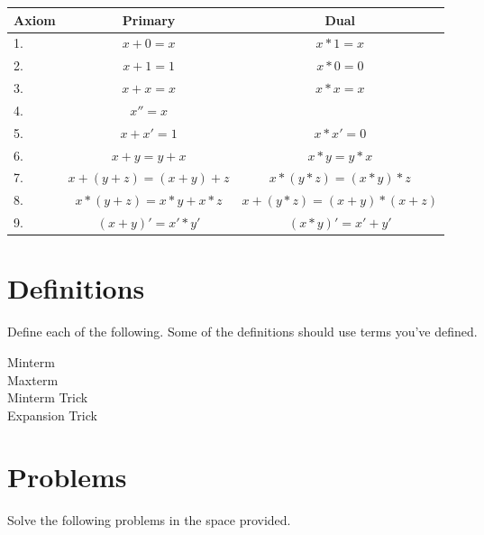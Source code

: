 \vspace{0.2in}
\begin{tabular}[ht]{lc>{\quad}c} %
    Axiom   &     Primary              &     Dual                    \\[0.1em] \hline
    1.      & $   x+0=x              $ & $   x*1=x                 $ \\[0.1em] \hline
    2.      & $   x+1=1              $ & $   x*0=0                 $ \\[0.1em] \hline
    3.      & $   x+x=x              $ & $   x*x=x                 $ \\[0.1em] \hline
    4.      & $   x''=x              $ & $                         $ \\[0.1em] \hline
    5.      & $   x+x'=1             $ & $   x*x'=0                $ \\[0.1em] \hline
    6.      & $   x+y=y+x            $ & $   x*y=y*x               $ \\[0.1em] \hline
    7.      & $   x+(y+z)=(x+y)+z    $ & $   x*(y*z)=(x*y)*z       $ \\[0.1em] \hline
    8.      & $   x*(y+z)=x*y+x*z    $ & $ x+(y*z)=(x+y)*(x+z)     $ \\[0.1em] \hline
    9.      & $   (x+y)'=x'*y'       $ & $   (x*y)'=x'+y'          $ \\[0.1em] \hline
\end{tabular}

\section{Definitions}
Define each of the following. Some of the definitions should use terms you've defined.
\begin{description}
    \item[Minterm]
    \item[Maxterm]
    \item[Minterm Trick]
    \item[Expansion Trick]
\end{description}

\section{Problems}
Solve the following problems in the space provided.

